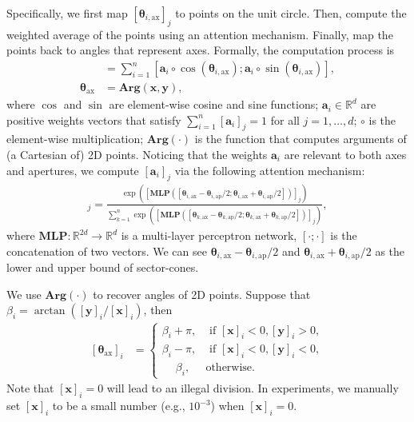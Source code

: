 \documentclass{article}
\newcommand{\gb}[1]{\boldsymbol{#1}}
\newcommand{\taxis}{\text{ax}}
\newcommand{\targ}{\text{ap}}
\begin{document}
Specifically, we first map $[\gb{\theta}_{i,\taxis}]_j$ to points on the unit circle. Then, compute the weighted average of the points using an attention mechanism. Finally, map the points back to angles that represent axes. 
Formally, the computation process is 
\begin{align*}
    [\mathbf{x};\mathbf{y}]&=\sum_{i=1}^n [\textbf{a}_i\circ\cos(\gb{\theta}_{i,\taxis});\textbf{a}_i\circ\sin(\gb{\theta}_{i,\taxis})],\\
    \gb{\theta}_{\taxis}&=\textbf{Arg}(\mathbf{x},\mathbf{y}),
\end{align*}
where $\cos$ and $\sin$ are element-wise cosine and sine functions; $\textbf{a}_i\in\mathbb{R}^d$ are positive weights vectors that satisfy $\sum_{i=1}^n [\textbf{a}_i]_j=1$ for all $j=1,\dots,d$; $\circ$ is the element-wise multiplication; $\textbf{Arg}(\cdot)$ is the function that computes arguments of (a Cartesian of) 2D points. 
Noticing that the weights $\textbf{a}_i$ are relevant to both axes and apertures, we compute $[\textbf{a}_i]_j$ via the following attention mechanism:
\begin{align*}
    [\textbf{a}_i]_j=\frac{\exp([\textbf{MLP}([\gb{\theta}_{i,\taxis}-\gb{\theta}_{i,\targ}/2;\gb{\theta}_{i,\taxis}+\gb{\theta}_{i,\targ}/2])]_j)}{\sum_{k=1}^n\exp([\textbf{MLP}([\gb{\theta}_{k,\taxis}-\gb{\theta}_{k,\targ}/2;\gb{\theta}_{k,\taxis}+\gb{\theta}_{k,\targ}/2])]_j)},
\end{align*}
where $\textbf{MLP}:\mathbb{R}^{2d}\rightarrow\mathbb{R}^d$ is a multi-layer perceptron network, $[\cdot;\cdot]$ is the concatenation of two vectors.
We can see $\gb{\theta}_{i,\taxis}-\gb{\theta}_{i,\targ}/2$ and $\gb{\theta}_{i,\taxis}+\gb{\theta}_{i,\targ}/2$ as the lower and upper bound of sector-cones.

We use $\textbf{Arg}(\cdot)$ to recover angles of 2D points. Suppose that $\beta_i=\arctan([\textbf{y}]_i/[\textbf{x}]_i)$, then
\begin{align*}
[\gb{\theta}_{\taxis}]_i&=
    \begin{cases}
    \beta_i+\pi, &\text{ if }[\textbf{x}]_i<0, [\textbf{y}]_i>0, \\
    \beta_i-\pi, &\text{ if }[\textbf{x}]_i<0, [\textbf{y}]_i<0, \\
    \,\,\,\,\,\,\ \beta_i, &\text{otherwise}.
    \end{cases}
\end{align*}
Note that $[\textbf{x}]_i=0$ will lead to an illegal division. In experiments, we manually set $[\textbf{x}]_i$ to be a small number (e.g., $10^{-3}$) when $[\textbf{x}]_i=0$.
\end{document}
